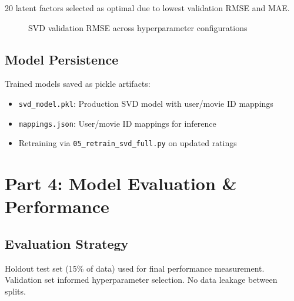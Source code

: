 \documentclass[11pt,a4paper]{article}
\begin{document}
20 latent factors selected as optimal due to lowest validation RMSE and MAE.

\begin{figure}[H]
\centering
{}
\caption{SVD validation RMSE across hyperparameter configurations}
\label{fig:svd_tuning_curve}
\end{figure}

\subsection{Model Persistence}

Trained models saved as pickle artifacts:

\begin{itemize}
    \item \texttt{svd\_model.pkl}: Production SVD model with user/movie ID mappings
    \item \texttt{mappings.json}: User/movie ID mappings for inference
    \item Retraining via \texttt{05\_retrain\_svd\_full.py} on updated ratings
\end{itemize}


\section{Part 4: Model Evaluation \& Performance}

\subsection{Evaluation Strategy}

Holdout test set (15\% of data) used for final performance measurement. Validation set informed hyperparameter selection. No data leakage between splits.
\end{document}
